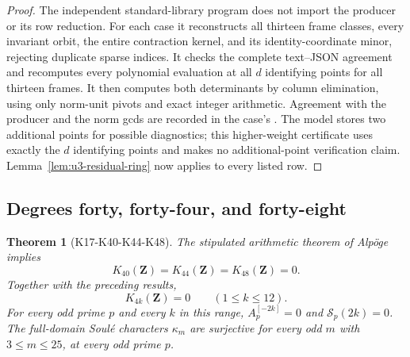 \documentclass[11pt,a4paper]{article}
\newtheorem{theorem}{Theorem}[section]
\theoremstyle{definition}
\begin{document}
\begin{proof}
The independent standard-library program
 does not import the producer or its
row reduction. For each case it reconstructs all thirteen frame
classes, every invariant orbit, the entire contraction kernel,
and its identity-coordinate minor, rejecting duplicate sparse
indices. It checks the complete text--JSON agreement and
recomputes every polynomial evaluation at all $d$ identifying
points for all thirteen frames. It then computes both determinants
by column elimination, using only norm-unit pivots and exact
integer arithmetic. Agreement with the producer and the norm
gcds are recorded in the case's .
The model stores two additional points for possible diagnostics;
this higher-weight certificate uses exactly the $d$ identifying
points and makes no additional-point verification claim.
Lemma~\ref{lem:u3-residual-ring} now applies to every listed row.
\end{proof}

\subsection{Degrees forty, forty-four, and forty-eight}
\label{sec:k40-k44-k48}

\begin{theorem}[K17-K40-K44-K48]\label{thm:k40-k44-k48}
The stipulated arithmetic theorem of Alp\"oge implies
\[
               K_{40}(\mathbf Z)=K_{44}(\mathbf Z)
                               =K_{48}(\mathbf Z)=0.
 \tag{HK3.1}
\]
Together with the preceding results,
\[
                K_{4k}(\mathbf Z)=0\qquad(1\leq k\leq12).
 \tag{HK3.2}
\]
For every odd prime $p$ and every $k$ in this range,
$A_p^{[-2k]}=0$ and $\mathcal S_p(2k)=0$.
The full-domain Soul\'e characters $\kappa_m$ are surjective
for every odd $m$ with $3\leq m\leq25$, at every odd prime $p$.
\end{theorem}
\end{document}
